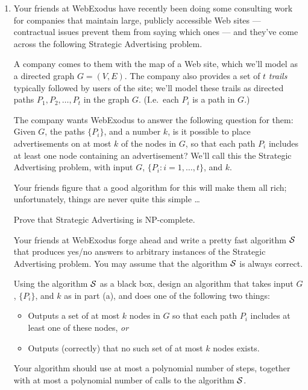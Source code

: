 \documentclass[12pt]{article}
\begin{document}
\begin{enumerate}
{}



\item

Your friends at WebExodus have recently been
doing some consulting work for companies that
maintain large, publicly accessible Web sites ---
contractual issues prevent them from saying which ones ---
and they've come across the following
{\sc Strategic Advertising} problem.

A company comes to them with the map of a Web site,
which we'll model as a directed graph $G = (V,E)$.
The company also provides a set of $t$ {\em trails}
typically followed by users of the site;
we'll model these trails as directed paths
$P_1, P_2, \ldots, P_t$ in the graph $G$.
(I.e.~each $P_i$ is a path in $G$.)

The company wants WebExodus to answer the following question
for them: Given $G$, the paths $\{P_i\}$, and a number $k$, is
it possible to place advertisements on at most $k$ of the nodes in $G$,
so that each path $P_i$ includes at least one node containing
an advertisement?
We'll call this the {\sc Strategic Advertising} problem,
with input $G$, $\{P_i : i = 1, \ldots, t\}$, and $k$.

Your friends figure that a good algorithm for this will
make them all rich; unfortunately, things are never quite this simple \ldots\

Prove that {\sc Strategic Advertising} is NP-complete.

Your friends at WebExodus forge ahead and write
a pretty fast algorithm $\cal S$ that produces
yes/no answers to arbitrary instances of the
{\sc Strategic Advertising} problem.
You may assume that the algorithm $\cal S$ is always correct.

Using the algorithm $\cal S$ as a black box,
design an algorithm that takes input $G$, $\{P_i\}$, and $k$
as in part (a), and does one of the following two things:
\begin{itemize}
\item Outputs a set of at most $k$ nodes in $G$ so that each path $P_i$
includes at least one of these nodes, {\em or}
\item Outputs (correctly) that no such set of at most $k$ nodes exists.
\end{itemize}
Your algorithm should use at most a polynomial number of steps, together
with at most a polynomial number of calls to the algorithm $\cal S$.


\end{enumerate}
\end{document}
